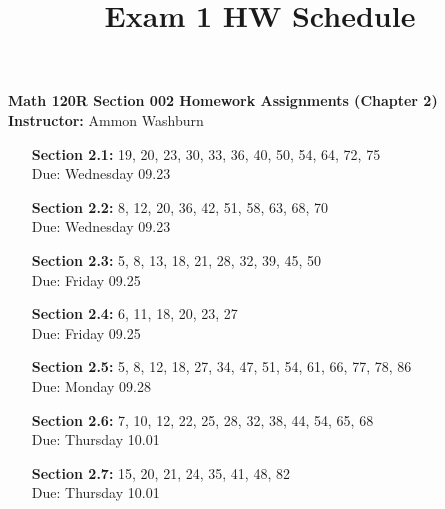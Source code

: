 \documentclass[fleqn]{article}
\title{Exam 1 HW Schedule}
\begin{document}
{\centering
{\bf Math 120R Section 002 Homework Assignments (Chapter 2)} \\[10px]
{\bf Instructor: } Ammon Washburn \\[20px]
}

\begin{enumerate}
\item[\bf Section 2.1:] 19, 20, 23, 30, 33, 36, 40, 50, 54, 64, 72, 75 \\{\color{blue} Due: Wednesday 09.23}

\item[\bf Section 2.2:] 8, 12, 20, 36, 42, 51, 58, 63, 68, 70 \\
{\color{blue} Due: Wednesday 09.23}

\item[\bf Section 2.3:] 5, 8, 13, 18, 21, 28, 32, 39, 45, 50 \\
{\color{blue} Due: Friday 09.25}

\item[\bf Section 2.4:] 6, 11, 18, 20, 23, 27  \\
{\color{blue} Due: Friday 09.25}

\item[\bf Section 2.5:] 5, 8, 12, 18, 27, 34, 47, 51, 54, 61, 66, 77, 78, 86  \\
{\color{blue} Due: Monday 09.28}

\item[\bf Section 2.6:] 7, 10, 12, 22, 25, 28, 32, 38, 44, 54, 65, 68  \\
{\color{blue} Due: Thursday 10.01}

\item[\bf Section 2.7:] 15, 20, 21, 24, 35, 41, 48, 82  \\
{\color{blue} Due: Thursday 10.01}

\end{enumerate}
\end{document}
